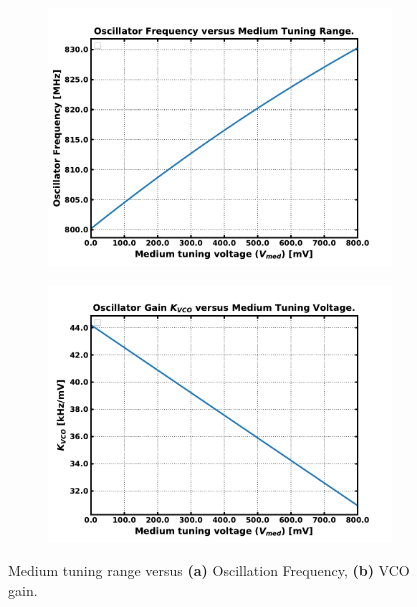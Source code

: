 	\begin{figure}[htb!]
	    \centering
	    \begin{subfigure}{0.5\textwidth}
	        \centering
	        \includegraphics[width=1\textwidth, angle=0]{./figs/results/osc_f_vs_med}
	        \caption{ }
	        \label{fig:osc_f_vs_med}
	    \end{subfigure}%
	    \begin{subfigure}{0.5\textwidth}
	        \centering
	        \includegraphics[width=1\textwidth, angle=0]{./figs/results/osc_f_gain_vs_med}
	        \caption{ }
	        \label{fig:osc_f_gain_vs_med}
	    \end{subfigure}
	    \label{fig:osc_f_med_tune}
	    \caption{Medium tuning range versus \textbf{(a)} Oscillation Frequency, \textbf{(b)} VCO gain.}
	\end{figure} 


